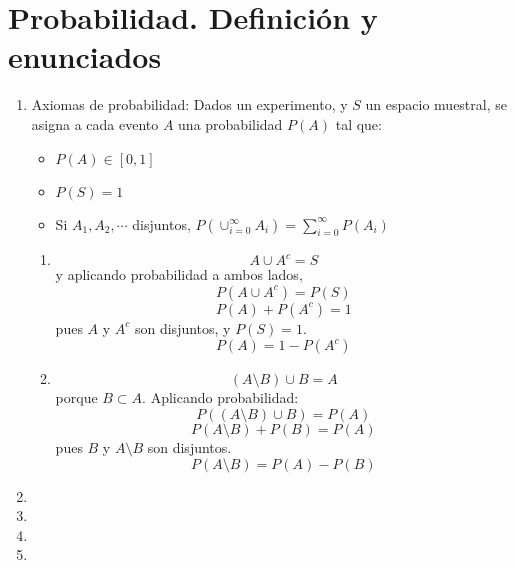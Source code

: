 \section{Probabilidad. Definici\'on y enunciados}
\begin{enumerate}
	\item Axiomas de probabilidad: Dados un experimento, y $S$ un espacio muestral, se asigna a cada evento $A$ una probabilidad $P(A)$ tal que:
	\begin{itemize}
		\item $P(A) \in [0,1]$
		\item $P(S) = 1$
		\item Si $A_1, A_2, \cdots$ disjuntos, $P(\cup_{i=0}^{\infty} A_i) = \sum_{i=0}^{\infty}P(A_i)$
	\end{itemize}
	\begin{enumerate}
		\item
			$$A \cup A^c = S$$ y aplicando probabilidad a ambos lados,
			$$P(A \cup A^c) = P(S)$$ 
			$$P(A) + P(A^c) = 1$$ pues $A$ y $A^c$ son disjuntos, y $P(S)=1$. 
			$$P(A) = 1 - P(A^c)$$ 
		\item 
			$$(A\setminus B) \cup B = A$$ porque $B\subset A$. Aplicando probabilidad:
			$$P((A\setminus B) \cup B) = P(A)$$
			$$P(A\setminus B) + P(B) = P(A)$$ pues $B$ y $A\setminus B$ son disjuntos.
			$$P(A\setminus B)= P(A) - P(B)$$
	\end{enumerate}
	\item 
	\item 
	\item 
	\item 
\end{enumerate}

